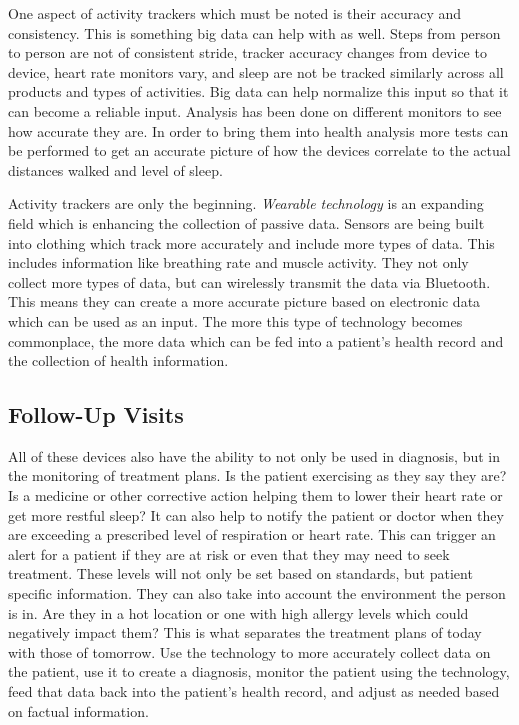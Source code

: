 \documentclass[sigconf]{acmart}
\begin{document}
One aspect of activity trackers which must be noted is their accuracy 
and consistency.  This is something big data can help with as well.   
Steps from person to person are not of consistent stride, tracker 
accuracy changes from device to device, heart rate monitors vary, and 
sleep are not be tracked similarly across all products and types of 
activities\cite{AceFitness}.  Big data can help normalize this input 
so that it can become a reliable input.  Analysis has been done on 
different monitors to see how accurate they are.  In order to bring 
them into health analysis more tests can be performed to get an 
accurate picture of how the devices correlate to the actual distances 
walked and level of sleep.

Activity trackers are only the beginning.  \emph{Wearable technology} 
is an expanding field which is enhancing the collection of passive 
data.  Sensors are being built into clothing which track more accurately 
and include more types of data\cite{DigitalTrends}.  This includes 
information like breathing rate and muscle activity.  They not only 
collect more types of data, but can wirelessly transmit the data via 
Bluetooth\cite{PocketLint}.  This means they can create a more accurate 
picture based on electronic data which can be used as an input.  The 
more this type of technology becomes commonplace, the more data which 
can be fed into a patient's health record and the collection of health 
information.  

\subsection{Follow-Up Visits}
All of these devices also have the ability to not only be used in 
diagnosis, but in the monitoring of treatment plans.  Is the patient 
exercising as they say they are?  Is a medicine or other corrective 
action helping them to lower their heart rate or get more restful 
sleep?  It can also help to notify the patient or doctor when they 
are exceeding a prescribed level of respiration or heart rate.  This 
can trigger an alert for a patient if they are at risk or even that 
they may need to seek treatment.  These levels will not only be set 
based on standards, but patient specific information\cite{PubHealth}.  
They can also take into account the environment the person is in.  
Are they in a hot location or one with high allergy levels which 
could negatively impact them?  This is what separates the treatment 
plans of today with those of tomorrow.  Use the technology to more 
accurately collect data on the patient, use it to create a diagnosis, 
monitor the patient using the technology, feed that data back into 
the patient's health record, and adjust as needed based on factual 
information.
\end{document}
